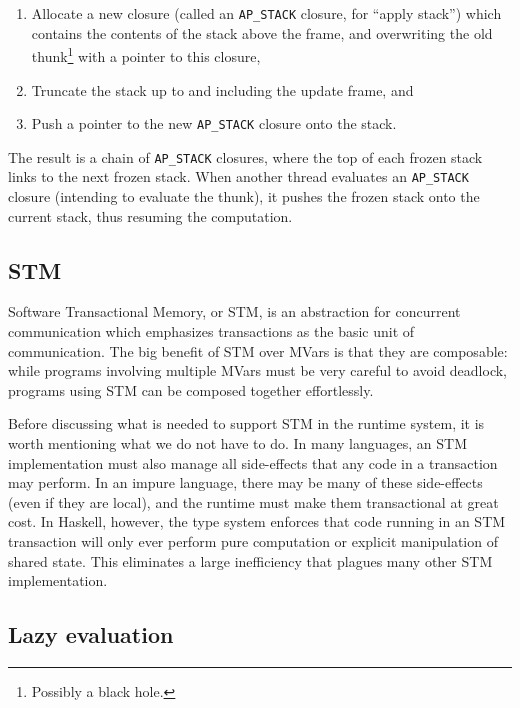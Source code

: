 \begin{enumerate}
    \item Allocate a new closure (called an \verb|AP_STACK| closure, for
        ``apply stack'') which contains the contents of the stack above
        the frame, and overwriting the old thunk\footnote{Possibly a
        black hole.} with a pointer to this closure,
    \item Truncate the stack up to and including the update frame, and
    \item Push a pointer to the new \verb|AP_STACK| closure onto the stack.
\end{enumerate}

The result is a chain of \verb|AP_STACK| closures, where the top of each
frozen stack links to the next frozen stack.  When another thread
evaluates an \verb|AP_STACK| closure (intending to evaluate the thunk),
it pushes the frozen stack onto the current stack, thus resuming the
computation.

\subsection{STM}

Software Transactional Memory, or STM, is an abstraction for concurrent
communication which emphasizes transactions as the basic unit of
communication.  The big benefit of STM over MVars is that they are
composable: while programs involving multiple MVars must be very careful
to avoid deadlock, programs using STM can be composed together
effortlessly.

Before discussing what is needed to support STM in the runtime system,
it is worth mentioning what we do not have to do.  In many languages,
an STM implementation must also manage all side-effects that any code
in a transaction may perform.  In an impure language, there may be many
of these side-effects (even if they are local), and the runtime must
make them transactional at great cost.  In Haskell, however, the type system
enforces that code running in an STM transaction will only ever perform
pure computation or explicit manipulation of shared state.  This eliminates
a large inefficiency that plagues many other STM implementation.



\subsection{Lazy evaluation}

